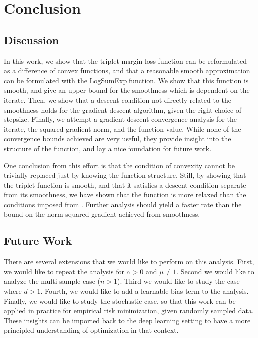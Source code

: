 \documentclass[11pt]{article}
\begin{document}

\section{Conclusion}

\subsection{Discussion}

In this work, we show that the triplet margin loss function can be reformulated as a difference of convex functions, and that a reasonable smooth approximation can be formulated with the LogSumExp function. We show that this function is smooth, and give an upper bound for the smoothness which is dependent on the iterate. Then, we show that a descent condition not directly related to the smoothness holds for the gradient descent algorithm, given the right choice of stepsize. Finally, we attempt a gradient descent convergence analysis for the iterate, the squared gradient norm, and the function value. While none of the convergence bounds achieved are very useful, they provide insight into the structure of the function, and lay a nice foundation for future work.

One conclusion from this effort is that the condition of convexity cannot be trivially replaced just by knowing the function structure. Still, by showing that the triplet function is smooth, and that it satisfies a descent condition separate from its smoothness, we have shown that the function is more relaxed than the conditions imposed from \cite{khamaru_convergence_2018}. Further analysis should yield a faster rate than the bound on the norm squared gradient achieved from smoothness.

\subsection{Future Work}

There are several extensions that we would like to perform on this analysis. First, we would like to repeat the analysis for $\alpha > 0$ and $\mu \neq 1$. Second we would like to analyze the multi-sample case ($n > 1$). Third we would like to study the case where $d > 1$. Fourth, we would like to add a learnable bias term to the analysis. Finally, we would like to study the stochastic case, so that this work can be applied in practice for empirical risk minimization, given randomly sampled data. These insights can be imported back to the deep learning setting to have a more principled understanding of optimization in that context.
\end{document}
